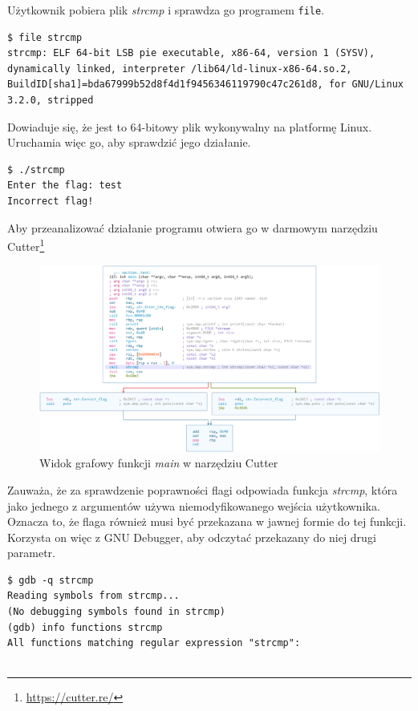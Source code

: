 \documentclass[language=polish,type=eng]{aghmodern}
\begin{document}
\begin{appendices}
Użytkownik pobiera plik \emph{strcmp} i sprawdza go programem \texttt{file}.

\begin{verbatim}
$ file strcmp
strcmp: ELF 64-bit LSB pie executable, x86-64, version 1 (SYSV), dynamically linked, interpreter /lib64/ld-linux-x86-64.so.2, BuildID[sha1]=bda67999b52d8f4d1f9456346119790c47c261d8, for GNU/Linux 3.2.0, stripped
\end{verbatim}

Dowiaduje się, że jest to 64-bitowy plik wykonywalny na platformę Linux.
Uruchamia więc go, aby sprawdzić jego działanie.

\begin{verbatim}
$ ./strcmp
Enter the flag: test
Incorrect flag!
\end{verbatim}

Aby przeanalizować działanie programu otwiera go w darmowym narzędziu Cutter\footnote{\url{https://cutter.re/}}

\begin{figure}[H]
\centering
\includegraphics[width=\textwidth]{300_cutter}
\caption{Widok grafowy funkcji \emph{main} w narzędziu Cutter}
\end{figure}

Zauważa, że za sprawdzenie poprawności flagi odpowiada funkcja \emph{strcmp}, która
jako jednego z argumentów używa niemodyfikowanego wejścia użytkownika.
Oznacza to, że flaga również musi być przekazana w jawnej formie do tej funkcji.
Korzysta on więc z GNU Debugger, aby odczytać przekazany do niej drugi parametr.

\begin{verbatim}
$ gdb -q strcmp
Reading symbols from strcmp...
(No debugging symbols found in strcmp)
(gdb) info functions strcmp
All functions matching regular expression "strcmp":


\end{verbatim}
\end{appendices}
\end{document}
